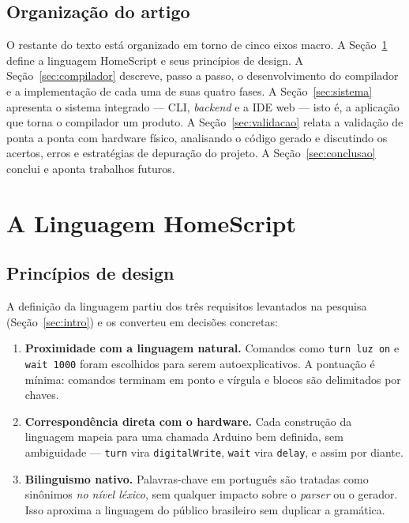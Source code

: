 \documentclass[conference]{IEEEtran}
\begin{document}
\subsection{Organização do artigo}

O restante do texto está organizado em torno de cinco eixos macro. A
Seção~\ref{sec:linguagem} define a linguagem HomeScript e seus princípios
de design. A Seção~\ref{sec:compilador} descreve, passo a passo, o
desenvolvimento do compilador e a implementação de cada uma de suas quatro
fases. A Seção~\ref{sec:sistema} apresenta o sistema integrado --- CLI,
\emph{backend} e a IDE web --- isto é, a aplicação que torna o compilador
um produto. A Seção~\ref{sec:validacao} relata a validação de ponta a
ponta com hardware físico, analisando o código gerado e discutindo os
acertos, erros e estratégias de depuração do projeto. A
Seção~\ref{sec:conclusao} conclui e aponta trabalhos futuros.

\section{A Linguagem HomeScript}
\label{sec:linguagem}

\subsection{Princípios de design}

A definição da linguagem partiu dos três requisitos levantados na pesquisa
(Seção~\ref{sec:intro}) e os converteu em decisões concretas:

\begin{enumerate}
\item \textbf{Proximidade com a linguagem natural.} Comandos como
\texttt{turn luz on} e \texttt{wait 1000} foram escolhidos para serem
autoexplicativos. A pontuação é mínima: comandos terminam em ponto e
vírgula e blocos são delimitados por chaves.
\item \textbf{Correspondência direta com o hardware.} Cada construção da
linguagem mapeia para uma chamada Arduino bem definida, sem ambiguidade ---
\texttt{turn} vira \texttt{digitalWrite}, \texttt{wait} vira
\texttt{delay}, e assim por diante.
\item \textbf{Bilinguismo nativo.} Palavras-chave em português são tratadas
como sinônimos \emph{no nível léxico}, sem qualquer impacto sobre o
\emph{parser} ou o gerador. Isso aproxima a linguagem do público
brasileiro sem duplicar a gramática.
\end{enumerate}
\end{document}
